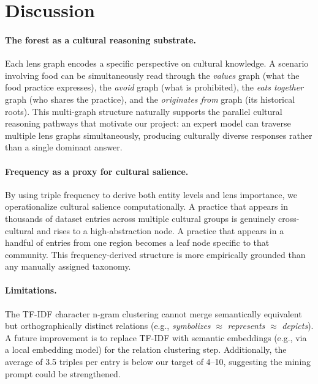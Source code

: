 \documentclass[11pt]{article}
\begin{document}
\section{Discussion}
\label{sec:discussion}

\paragraph{The forest as a cultural reasoning substrate.}
Each lens graph encodes a specific perspective on cultural knowledge.
A scenario involving food can be simultaneously read through the
\emph{values} graph (what the food practice expresses), the
\emph{avoid} graph (what is prohibited), the \emph{eats together} graph
(who shares the practice), and the \emph{originates from} graph (its
historical roots).
This multi-graph structure naturally supports the parallel cultural
reasoning pathways that motivate our project: an expert model can traverse
multiple lens graphs simultaneously, producing culturally diverse responses
rather than a single dominant answer.

\paragraph{Frequency as a proxy for cultural salience.}
By using triple frequency to derive both entity levels and lens importance,
we operationalize cultural salience computationally.
A practice that appears in thousands of dataset entries across multiple
cultural groups is genuinely cross-cultural and rises to a high-abstraction
node. A practice that appears in a handful of entries from one region
becomes a leaf node specific to that community.
This frequency-derived structure is more empirically grounded than any
manually assigned taxonomy.

\paragraph{Limitations.}
The TF-IDF character n-gram clustering cannot merge semantically equivalent
but orthographically distinct relations (e.g., \emph{symbolizes} $\approx$
\emph{represents} $\approx$ \emph{depicts}).
A future improvement is to replace TF-IDF with semantic embeddings
(e.g., via a local embedding model) for the relation clustering step.
Additionally, the average of 3.5 triples per entry is below our target of
4--10, suggesting the mining prompt could be strengthened.
\end{document}
